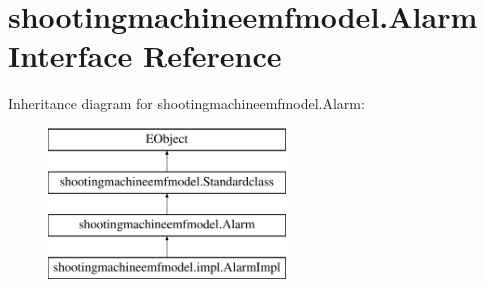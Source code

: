 \hypertarget{interfaceshootingmachineemfmodel_1_1_alarm}{\section{shootingmachineemfmodel.\-Alarm Interface Reference}
\label{interfaceshootingmachineemfmodel_1_1_alarm}
}
Inheritance diagram for shootingmachineemfmodel.\-Alarm\-:\begin{figure}[H]
\begin{center}
\leavevmode
\includegraphics[height=4.000000cm]{interfaceshootingmachineemfmodel_1_1_alarm}
\end{center}
\end{figure}
